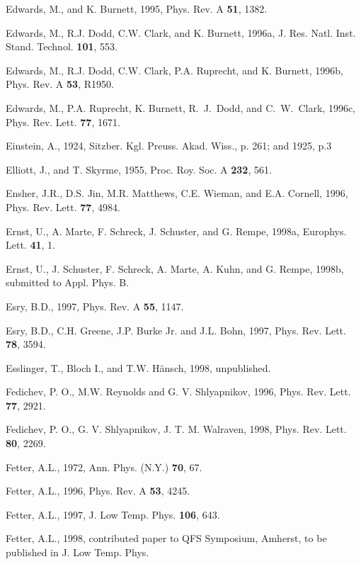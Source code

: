\begin{references}
  Edwards, M., and K. Burnett, 1995, Phys. Rev. A
{\bf 51}, 1382.

 Edwards, M., R.J. Dodd, C.W. Clark, and K. Burnett,
1996a, J. Res. Natl. Inst. Stand. Technol. {\bf 101}, 553.

 Edwards, M., R.J. Dodd, C.W. Clark, P.A. Ruprecht,
and K. Burnett, 1996b, Phys. Rev. A {\bf 53}, R1950.

 Edwards, M., P.A. Ruprecht, K. Burnett, R.\ J.\
Dodd, and C.\ W.\ Clark, 1996c, Phys. Rev. Lett. {\bf 77}, 1671.

 Einstein, A., 1924, Sitzber. Kgl. Preuss. Akad.
Wiss., p. 261; and 1925, p.3

    Elliott, J., and T. Skyrme, 1955, Proc. Roy. Soc. A
{\bf 232}, 561.

  Ensher, J.R., D.S. Jin, M.R. Matthews, C.E.
Wieman, and E.A. Cornell, 1996, Phys. Rev. Lett. {\bf 77}, 4984.

    Ernst, U., A. Marte, F. Schreck, J. Schuster, and
G. Rempe, 1998a, Europhys. Lett. {\bf 41}, 1.

    Ernst, U., J. Schuster, F. Schreck,  A. Marte, 
A. Kuhn, and G. Rempe, 1998b, submitted to Appl. Phys. B.

    Esry, B.D., 1997, Phys. Rev. A {\bf 55}, 1147.

    Esry, B.D., C.H. Greene, J.P. Burke Jr. and J.L.
Bohn, 1997, Phys. Rev. Lett. {\bf 78}, 3594.

 Esslinger, T., Bloch I., and T.W. H\"ansch, 1998,
unpublished.

 Fedichev, P. O., M.W. Reynolds and G. V. Shlyapnikov,
1996, Phys. Rev. Lett. {\bf 77}, 2921.  

 Fedichev, P. O., G. V. Shlyapnikov, J. T. M.
Walraven, 1998, Phys. Rev. Lett. {\bf 80}, 2269.

   Fetter, A.L., 1972, Ann. Phys. (N.Y.) {\bf 70}, 67.

   Fetter, A.L., 1996, Phys. Rev. A {\bf 53}, 4245. 

 Fetter, A.L., 1997, J. Low Temp. Phys. {\bf 106}, 643.

   Fetter, A.L., 1998, contributed paper to QFS Symposium,
Amherst, to be published in J. Low Temp. Phys.


\end{references}
